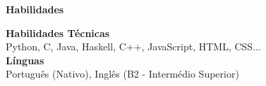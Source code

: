 \noindent\textbf{Habilidades}
\noindent\hrulefill
\vspace{0.25em}
\begin{adjustwidth}{1.5em}{0em}
\textbf{Habilidades Técnicas}\\
Python, C, Java, Haskell, C++, JavaScript, HTML, CSS...
\vspace{0.5em}
\\
\textbf{Línguas}\\
Português (Nativo), Inglês (B2 - Intermédio Superior)
\end{adjustwidth}
\vspace{0.25em}